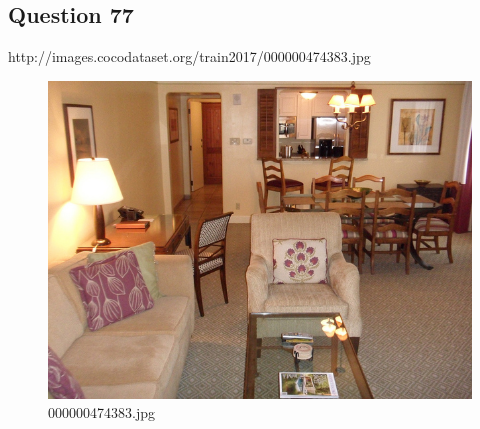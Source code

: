 \subsection*{Question 77}
http://images.cocodataset.org/train2017/000000474383.jpg
\begin{figure}[h]
    \centering
    \includegraphics[width=0.8\linewidth]{../image set/hard/000000474383.jpg}
    \caption{000000474383.jpg}
\end{figure}
